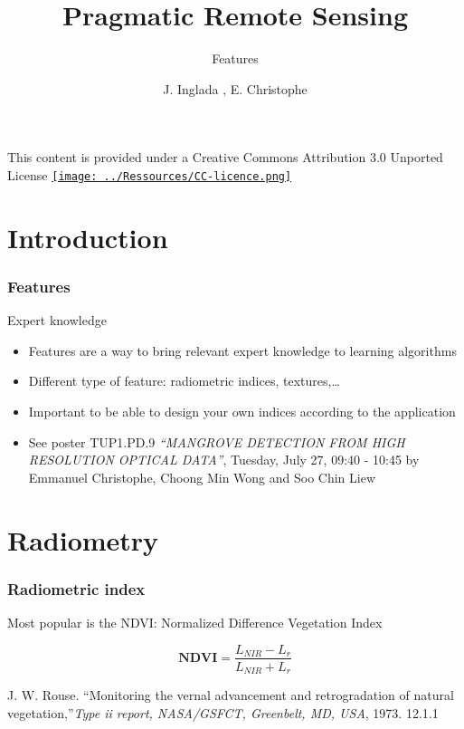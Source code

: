 \documentclass[compress]{beamer}
\title{Pragmatic Remote Sensing}
\subtitle{Features} %
\author
{J. Inglada\inst{1} , E. Christophe\inst{2}}
\institute[Cesbio, Crisp] %
{\inst{1}\textsc{Centre d'Études Spatiales de la Biosphère, Toulouse, France}
\and
\inst{2}\textsc{Centre for Remote Imaging, Sensing and Processing,\\ National University of Singapore}
}
\date{}
\begin{document}
\begin{frame}
  \titlepage
{\tiny This content is provided under a Creative Commons
  Attribution 3.0 Unported License} \href{http://creativecommons.org/licenses/by/3.0/}{\texttt{[image: ../Ressources/CC-licence.png]}}
\end{frame}

\section{Introduction}

\begin{frame}
\frametitle{Features}

\begin{block}{Expert knowledge}
\begin{itemize}
\item Features are a way to bring relevant expert knowledge to learning
 algorithms
\item Different type of feature: radiometric indices, textures,\ldots
\item Important to be able to design your own indices according to the
      application
    \item See poster TUP1.PD.9 {\em ``MANGROVE DETECTION FROM HIGH
          RESOLUTION OPTICAL DATA''}, Tuesday, July 27, 09:40 - 10:45 by
          Emmanuel Christophe, Choong Min Wong and Soo Chin Liew
\end{itemize}
\end{block}

\end{frame}

\section{Radiometry}

\begin{frame}
\frametitle{Radiometric index}
Most popular is the NDVI: Normalized Difference Vegetation Index \cite{Rouse1973-NDVI}

\begin{equation}
 \mathbf{NDVI} = \frac{L_{NIR}-L_{r}}{L_{NIR}+L_{r}}
 \end{equation}

\begin{thebibliography}{noidea}
\footnotesize
{}
J. W. Rouse. ``Monitoring the vernal advancement and retrogradation of natural vegetation,''{\em Type ii report, NASA/GSFCT, Greenbelt, MD, USA}, 1973. 12.1.1
\end{thebibliography}

\end{frame}
\end{document}
